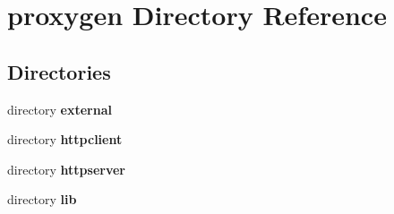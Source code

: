 \section{proxygen Directory Reference}
\label{dir_d333e33cf903653326082c1f32e03be5}
\subsection*{Directories}
\begin{DoxyCompactItemize}
\item 
directory {\bf external}
\item 
directory {\bf httpclient}
\item 
directory {\bf httpserver}
\item 
directory {\bf lib}
\end{DoxyCompactItemize}
